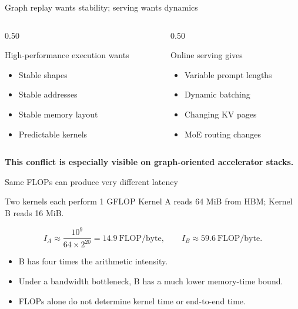 \documentclass[aspectratio=169,11pt]{beamer}
\newcommand{\key}[1]{\textcolor{HUSTDeep}{\textbf{#1}}}
\begin{document}
\begin{frame}{Graph replay wants stability; serving wants dynamics}
  \begin{columns}[T,totalwidth=\textwidth]
    \begin{column}{0.50\textwidth}
      \begin{block}{High-performance execution wants}
        \begin{itemize}
          \item Stable shapes
          \item Stable addresses
          \item Stable memory layout
          \item Predictable kernels
        \end{itemize}
      \end{block}
    \end{column}
    \begin{column}{0.50\textwidth}
      \begin{block}{Online serving gives}
        \begin{itemize}
          \item Variable prompt lengths
          \item Dynamic batching
          \item Changing KV pages
          \item MoE routing changes
        \end{itemize}
      \end{block}
    \end{column}
  \end{columns}
  \vspace{0.3cm}
  \key{This conflict is especially visible on graph-oriented accelerator stacks.}
\end{frame}

\fi

\begin{frame}{Same FLOPs can produce very different latency}
  \begin{block}{Two kernels each perform 1 GFLOP}
    Kernel A reads 64 MiB from HBM; Kernel B reads 16 MiB.
  \end{block}
  \[
    I_A\approx\frac{10^9}{64\times2^{20}}=14.9\ \text{FLOP/byte},
    \qquad
    I_B\approx59.6\ \text{FLOP/byte}.
  \]
  \begin{itemize}
    \item B has four times the arithmetic intensity.
    \item Under a bandwidth bottleneck, B has a much lower memory-time bound.
    \item FLOPs alone do not determine kernel time or end-to-end time.
  \end{itemize}
\end{frame}
\end{document}
